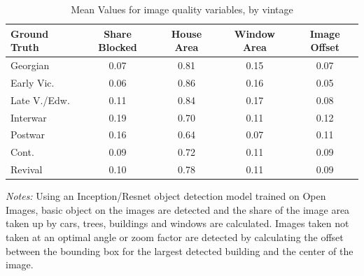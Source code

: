\documentclass[]{article}
\begin{document}
\begin{table}[ht] 
\centering 
 \caption{Mean Values for image quality variables, by vintage}
 
\label{tab:imgqualsumstats}
\begin{tabular}{lcccc} 
\toprule 
Ground Truth & Share Blocked & House Area & Window Area & Image Offset \\ 
\midrule
 Georgian & 0.07 & 0.81 & 0.15 & 0.07 \\ 
 Early Vic. & 0.06 & 0.86 & 0.16 & 0.05 \\ 
 Late V./Edw. & 0.11 & 0.84 & 0.17 & 0.08 \\ 
 Interwar & 0.19 & 0.70 & 0.11 & 0.12 \\ 
 Postwar & 0.16 & 0.64 & 0.07 & 0.11 \\ 
 Cont. & 0.09 & 0.72 & 0.11 & 0.09 \\ 
 Revival & 0.10 & 0.78 & 0.11 & 0.09 \\ 
 \bottomrule
\end{tabular}
\begin{minipage}{0.9\textwidth}
\vspace{0.25cm}
\footnotesize \emph{Notes:} Using an Inception/Resnet object detection model trained on Open Images, basic object on the images are detected and the share of the image area taken up by cars, trees, buildings and windows are calculated. Images taken not taken at an optimal angle or zoom factor are detected by calculating the offset between the bounding box for the largest detected building and the center of the image.
\end{minipage}
\end{table}
\end{document}

